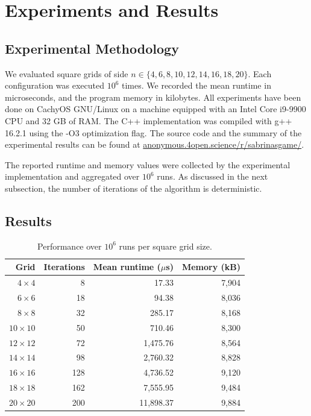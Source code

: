 \documentclass[svgnames,table,runningheads]{llncs}
\begin{document}
\section{Experiments and Results}
\label{sec:experimentsandresults}
\subsection{Experimental Methodology}
We evaluated square grids of side $n\in\{4,6,8,10,12,14,16,18,20\}$. Each configuration was executed $10^6$ times. We recorded the mean runtime in microseconds, and the program memory in kilobytes. All experiments have been done on CachyOS GNU/Linux on a machine equipped with an Intel Core i9-9900 CPU and 32 GB of RAM. The C++ implementation was compiled with g++ 16.2.1 using the -O3 optimization flag. The source code and the summary of the experimental results can be found at \href{https://anonymous.4open.science/r/sabrinasgame/}{anonymous.4open.science/r/sabrinasgame/}.

The reported runtime and memory values were collected by the experimental implementation and aggregated over \(10^6\) runs. As discussed in the next subsection, the number of iterations of the algorithm is deterministic.

\subsection{Results}

\begin{table}[t]
\centering
\caption{Performance over $10^6$ runs per square grid size.}\label{tab:results}
\begin{tabular}{rrrr}
\toprule
Grid & \quad Iterations & \quad Mean runtime ($\mu$s) & \quad Memory (kB)\\
\midrule
$4\times4$   & 8   & 17.33   & 7,904\\
$6\times6$   & 18  & 94.38   & 8,036\\
$8\times8$   & 32  & 285.17  & 8,168\\
$10\times10$ & 50  & 710.46  & 8,300\\
$12\times12$ & 72  & 1,475.76 & 8,564\\
$14\times14$ & 98  & 2,760.32 & 8,828\\
$16\times16$ & 128 & 4,736.52 & 9,120\\
$18\times18$ & 162 & 7,555.95 & 9,484\\
$20\times20$ & 200 & 11,898.37 & 9,884\\
\bottomrule
\end{tabular}
\end{table}
\end{document}
